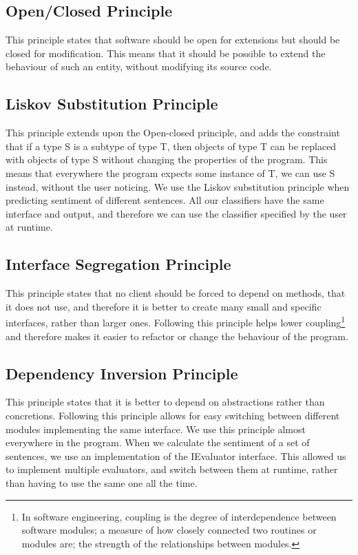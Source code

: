 \subsection{Open/Closed Principle}
This principle states that software should be open for extensions but should be closed for modification. This means that it should be possible to extend the behaviour of such an entity, without modifying its source code.

\subsection{Liskov Substitution Principle}
This principle extends upon the Open-closed principle, and adds the constraint that if a type S is a subtype of type T, then objects of type T can be replaced with objects of type S without changing the properties of the program. 
This means that everywhere the program expects some instance of T, we can use S instead, without the user noticing.
We use the Liskov substitution principle when predicting sentiment of different sentences. All our classifiers have the same interface and output, and therefore we can use the classifier specified by the user at runtime.

\subsection{Interface Segregation Principle}
This principle states that no client should be forced to depend on methods, that it does not use, and therefore it is better to create many small and specific interfaces, rather than larger ones. Following this principle helps lower coupling\footnote{In software engineering, coupling is the degree of interdependence between software modules; a measure of how closely connected two routines or modules are; the strength of the relationships between modules.} and therefore makes it easier to refactor or change the behaviour of the program. 

\subsection{Dependency Inversion Principle}
This principle states that it is better to depend on abstractions rather than concretions. Following this principle allows for easy switching between different modules implementing the same interface. We use this principle almost everywhere in the program. When we calculate the sentiment of a set of sentences, we use an implementation of the IEvaluator interface. This allowed us to implement multiple evaluators, and switch between them at runtime, rather than having to use the same one all the time.

